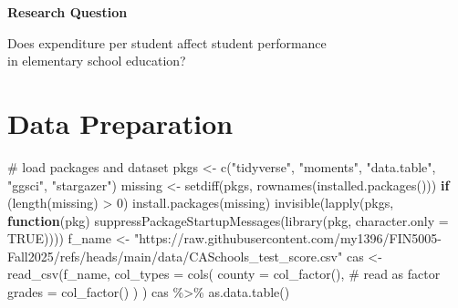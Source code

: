 \documentclass[
  12pt,
  letterpaper,
]{scrbook}
\newenvironment{Shaded}{\begin{snugshade}}{\end{snugshade}}
\newcommand{\AttributeTok}[1]{\textcolor[rgb]{0.40,0.45,0.13}{#1}}
\newcommand{\CommentTok}[1]{\textcolor[rgb]{0.37,0.37,0.37}{#1}}
\newcommand{\ConstantTok}[1]{\textcolor[rgb]{0.56,0.35,0.01}{#1}}
\newcommand{\ControlFlowTok}[1]{\textcolor[rgb]{0.00,0.23,0.31}{\textbf{#1}}}
\newcommand{\DecValTok}[1]{\textcolor[rgb]{0.68,0.00,0.00}{#1}}
\newcommand{\FunctionTok}[1]{\textcolor[rgb]{0.28,0.35,0.67}{#1}}
\newcommand{\NormalTok}[1]{\textcolor[rgb]{0.00,0.23,0.31}{#1}}
\newcommand{\OtherTok}[1]{\textcolor[rgb]{0.00,0.23,0.31}{#1}}
\newcommand{\SpecialCharTok}[1]{\textcolor[rgb]{0.37,0.37,0.37}{#1}}
\newcommand{\StringTok}[1]{\textcolor[rgb]{0.13,0.47,0.30}{#1}}
\theoremstyle{definition}
\theoremstyle{plain}
\theoremstyle{remark}
\begin{document}
\begin{tcolorbox}[enhanced jigsaw, arc=.35mm, bottomrule=.15mm, leftrule=.75mm, colback=white, left=2mm, toprule=.15mm, breakable, rightrule=.15mm, colframe=quarto-callout-important-color-frame, opacityback=0]

\vspace{-3mm}\textbf{Research Question}\vspace{3mm}

Does expenditure per student affect student performance\\
in elementary school education?

\end{tcolorbox}

\section{Data Preparation}\label{data-preparation}

\begin{Shaded}
\begin{Highlighting}[]
\CommentTok{\# load packages and dataset}
\NormalTok{pkgs }\OtherTok{\textless{}{-}} \FunctionTok{c}\NormalTok{(}\StringTok{"tidyverse"}\NormalTok{, }\StringTok{"moments"}\NormalTok{, }\StringTok{"data.table"}\NormalTok{, }\StringTok{"ggsci"}\NormalTok{, }\StringTok{"stargazer"}\NormalTok{)}
\NormalTok{missing }\OtherTok{\textless{}{-}} \FunctionTok{setdiff}\NormalTok{(pkgs, }\FunctionTok{rownames}\NormalTok{(}\FunctionTok{installed.packages}\NormalTok{()))}
\ControlFlowTok{if}\NormalTok{ (}\FunctionTok{length}\NormalTok{(missing) }\SpecialCharTok{\textgreater{}} \DecValTok{0}\NormalTok{) }\FunctionTok{install.packages}\NormalTok{(missing)}
\FunctionTok{invisible}\NormalTok{(}\FunctionTok{lapply}\NormalTok{(pkgs, }\ControlFlowTok{function}\NormalTok{(pkg) }\FunctionTok{suppressPackageStartupMessages}\NormalTok{(}\FunctionTok{library}\NormalTok{(pkg, }\AttributeTok{character.only =} \ConstantTok{TRUE}\NormalTok{))))}
\NormalTok{f\_name }\OtherTok{\textless{}{-}} \StringTok{"https://raw.githubusercontent.com/my1396/FIN5005{-}Fall2025/refs/heads/main/data/CASchools\_test\_score.csv"}
\NormalTok{cas }\OtherTok{\textless{}{-}} \FunctionTok{read\_csv}\NormalTok{(f\_name,}
    \AttributeTok{col\_types =} \FunctionTok{cols}\NormalTok{(}
        \AttributeTok{county =} \FunctionTok{col\_factor}\NormalTok{(), }\CommentTok{\# read as factor}
        \AttributeTok{grades =} \FunctionTok{col\_factor}\NormalTok{()}
\NormalTok{    )}
\NormalTok{)}
\NormalTok{cas }\SpecialCharTok{\%\textgreater{}\%} \FunctionTok{as.data.table}\NormalTok{()}
\end{Highlighting}
\end{Shaded}
\end{document}
